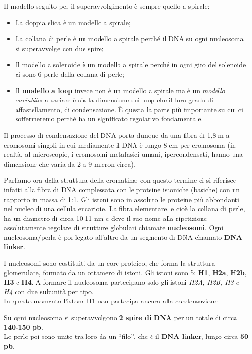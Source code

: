 \documentclass[11pt]{book}
\begin{document}
Il modello seguito per il superavvolgimento è sempre quello a spirale:
\begin{itemize}
\item La doppia elica è un modello a spirale;
\item La collana di perle è un modello a spirale perché il DNA su ogni nucleosoma si superavvolge con due spire;
\item Il modello a solenoide è un modello a spirale perché in ogni giro del solenoide ci sono 6 perle della collana di perle;
\item Il \textbf{modello a loop} invece \underline{non è} un modello a spirale ma è un \emph{modello variabile}: a variare è sia la dimensione dei loop che il loro grado di affastellamento, di condensazione. È questa la parte più importante su cui ci soffermeremo perché ha un significato regolativo fondamentale.
\end{itemize}

Il processo di condensazione del DNA porta dunque da una fibra di 1,8 m a cromosomi singoli in cui mediamente il DNA è lungo 8 cm per cromosoma (in realtà, al microscopio, i cromosomi metafasici umani, ipercondensati, hanno una dimensione che varia da 2 a 9 micron circa).

Parliamo ora della struttura della cromatina: con questo termine ci si riferisce infatti alla fibra di DNA complessata con le proteine istoniche (basiche) con un rapporto in massa di 1:1.
Gli istoni sono in assoluto le proteine più abbondanti nel nucleo di una cellula eucariote.
La fibra elementare, e cioè la collana di perle, ha un diametro di circa 10-11 nm e deve il suo nome alla ripetizione assolutamente regolare di strutture globulari chiamate \textbf{nucleosomi}. Ogni nucleosoma/perla è poi legato all'altro da un segmento di DNA chiamato \textbf{DNA linker}.

I nucleosomi sono costituiti da un core proteico, che forma la struttura glomerulare, formato da un ottamero di istoni. Gli istoni sono 5: \textbf{H1}, \textbf{H2a}, \textbf{H2b}, \textbf{H3} e \textbf{H4}.
A formare il nucleosoma partecipano solo gli istoni\emph{ H2A, H2B, H3 e H4} con due subunità per tipo.\\
In questo momento l’istone H1 non partecipa ancora alla condensazione.

Su ogni nucleosoma si superavvolgono \textbf{2 spire di DNA} per un totale di circa \textbf{140-150 pb}.\\
Le perle poi sono unite tra loro da un ``filo'', che è il \textbf{DNA linker}, lungo circa \textbf{50 pb}.
\end{document}
